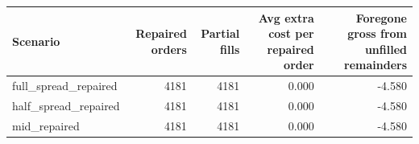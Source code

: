 \begin{tabular}{lrrrr}
\toprule
Scenario & Repaired orders & Partial fills & Avg extra cost per repaired order & Foregone gross from unfilled remainders \\
\midrule
full\_spread\_repaired & 4181 & 4181 & 0.000 & -4.580 \\
half\_spread\_repaired & 4181 & 4181 & 0.000 & -4.580 \\
mid\_repaired & 4181 & 4181 & 0.000 & -4.580 \\
\bottomrule
\end{tabular}
